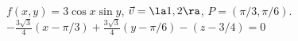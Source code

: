 {$f(x,y) = 3\cos x\sin y$,  $\vec v = \la 1,2\ra$, $P=(\pi/3, \pi/6)$.
}
{
$-\frac{3\sqrt{3}}4(x-\pi/3)+\frac{3\sqrt{3}}4(y-\pi/6) - (z-3/4) = 0$
}